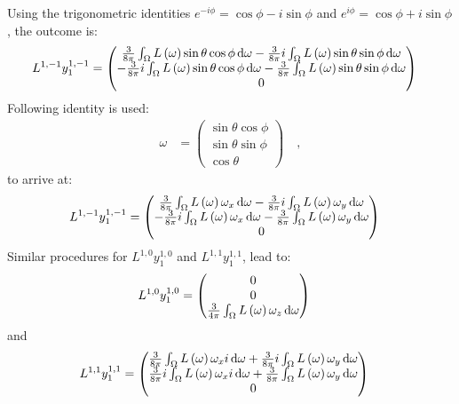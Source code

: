Using the trigonometric identities $e^{-i\phi} = \operatorname{cos}\phi - i\operatorname{sin}\phi$ and $e^{i\phi} = \operatorname{cos}\phi + i\operatorname{sin}\phi$, the outcome is:
\begin{align}
L^{1,-1}y^{1,-1}_1 &= 
\begin{pmatrix}
\frac{3}{8\pi}\int_\Omega{L\left(\omega\right)\operatorname{sin}\theta\operatorname{cos}\phi\,\mathrm{d}\omega} - \frac{3}{8\pi}i\int_\Omega{L\left(\omega\right)\operatorname{sin}\theta\operatorname{sin}\phi\,\mathrm{d}\omega}
\\
-\frac{3}{8\pi}i\int_\Omega{L\left(\omega\right)\operatorname{sin}\theta\operatorname{cos}\phi\,\mathrm{d}\omega} - \frac{3}{8\pi}\int_\Omega{L\left(\omega\right)\operatorname{sin}\theta\operatorname{sin}\phi\,\mathrm{d}\omega}
\\
0
\end{pmatrix}
\end{align}
Following identity is used:
\begin{align}
\omega &= 
\begin{pmatrix}
\operatorname{sin}\theta\operatorname{cos}\phi
\\
\operatorname{sin}\theta\operatorname{sin}\phi
\\
\operatorname{cos}\theta
\end{pmatrix}\quad,
\end{align}
to arrive at:
\begin{align}
L^{1,-1}y^{1,-1}_1 &= 
\begin{pmatrix}
\frac{3}{8\pi}\int_\Omega{L\left(\omega\right)\omega_x\,\mathrm{d}\omega} - \frac{3}{8\pi}i\int_\Omega{L\left(\omega\right)\omega_y\,\mathrm{d}\omega}
\\
-\frac{3}{8\pi}i\int_\Omega{L\left(\omega\right)\omega_x\,\mathrm{d}\omega} - \frac{3}{8\pi}\int_\Omega{L\left(\omega\right)\omega_y\,\mathrm{d}\omega}
\\
0
\end{pmatrix}
\end{align}
Similar procedures for $L^{1,0}y^{1,0}_1$ and $L^{1,1}y^{1,1}_1$, lead to:
\begin{align}
L^{1,0}y^{1,0}_1 &= 
\begin{pmatrix}
0\\
0\\
\frac{3}{4\pi}\int_\Omega{L\left(\omega\right)\omega_z\,\mathrm{d}\omega}
\end{pmatrix}
\end{align}
and
\begin{align}
L^{1,1}y^{1,1}_1 &= 
\begin{pmatrix}
\frac{3}{8\pi}\int_\Omega{L\left(\omega\right)\omega_xi\,\mathrm{d}\omega} + \frac{3}{8\pi}i\int_\Omega{L\left(\omega\right)\omega_y\,\mathrm{d}\omega}
\\
\frac{3}{8\pi}i\int_\Omega{L\left(\omega\right)\omega_xi\,\mathrm{d}\omega} + \frac{3}{8\pi}\int_\Omega{L\left(\omega\right)\omega_y\,\mathrm{d}\omega}
\\
0
\end{pmatrix}
\end{align}
